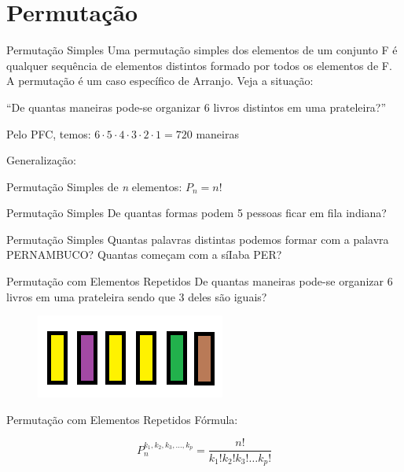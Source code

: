 \documentclass[aspectratio=169,xcolor=dvipsnames]{beamer}
\begin{document}
\section{Permutação}
\begin{frame}{Permutação Simples}
    Uma permutação simples dos elementos de um conjunto F é qualquer sequência de elementos distintos formado por todos os elementos de F. A permutação é um caso específico de Arranjo. Veja a situação:
    \vspace{.5cm}

    ``De quantas maneiras pode-se organizar 6 livros distintos em uma prateleira?''
    \vspace{.5cm}

    Pelo PFC, temos: $6 \cdot 5 \cdot 4 \cdot 3 \cdot 2 \cdot 1 = 720$ maneiras
    \vspace{.5cm}

    Generalização:

    Permutação Simples de \textit{n} elementos: $P_n = n!$

\end{frame}

\begin{frame}[t]{Permutação Simples}
    De quantas formas podem 5 pessoas ficar em fila indiana?
\end{frame}

\begin{frame}[t]{Permutação Simples}
    Quantas palavras distintas podemos formar com a palavra PERNAMBUCO? Quantas começam com a síIaba PER?
\end{frame}

\begin{frame}[t]{Permutação com Elementos Repetidos}
    De quantas maneiras pode-se organizar 6 livros em uma prateleira sendo que 3 deles são iguais?
      \begin{figure}[htb!]
        \centering
        \includegraphics[width=.3\linewidth]{images/im3.png}
      \end{figure}
\end{frame}

\begin{frame}{Permutação com Elementos Repetidos}
    Fórmula:

    \begin{equation*}
        P_n^{k_1, k_2, k_3, \dots , k_p} = \dfrac{n!}{k_1!k_2!k_3!\dots k_p!}
    \end{equation*}
\end{frame}
\end{document}
